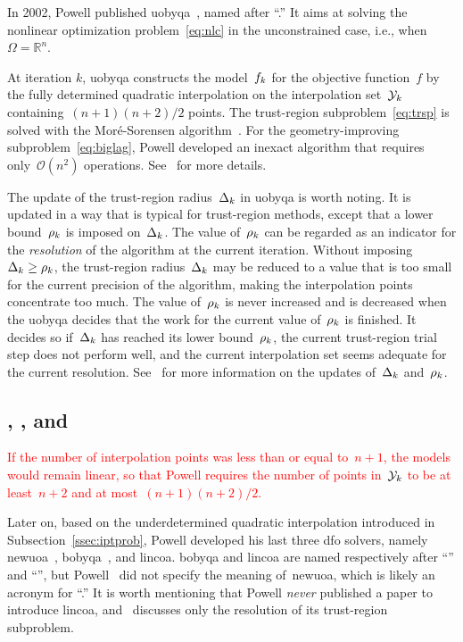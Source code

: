 \documentclass[
    smallextended,  %
    final,        %
]{svjour3}
\newcommand{\R}{\mathbb{R}}
\newcommand{\fset}{\Omega}
\newcommand{\objm}[1][k]{\obj\ifthenelse{\equal{#1}{}}{}{_{#1}}}
\newcommand{\obj}{f}
\newcommand{\rad}[1][k]{\Delta\ifthenelse{\equal{#1}{}}{}{_{#1}}}
\newcommand{\radlb}[1][k]{\rho\ifthenelse{\equal{#1}{}}{}{_{#1}}}
\newcommand{\xpt}[1][k]{\mathcal{Y}\ifthenelse{\equal{#1}{}}{}{_{#1}}}
\newcommand{\red}{\textcolor{red}}
\begin{document}
In 2002, Powell published \gls{uobyqa}~\cite{Powell_2002}, named after ``.''
It aims at solving the nonlinear optimization problem~\eqref{eq:nlc} in the unconstrained case, i.e., when~$\fset = \R^n$.


At iteration $k$, \gls{uobyqa} constructs the model~$\objm$ for the objective function~$\obj$
by the fully determined quadratic interpolation on the interpolation set~$\xpt$ containing~$(n + 1)(n + 2) / 2$ points.
The trust-region subproblem~\eqref{eq:trsp} is solved with the Mor{\'{e}}-Sorensen algorithm~\cite{More_Sorensen_1983}.
For the geometry-improving subproblem~\eqref{eq:biglag}, Powell developed an inexact algorithm that requires only~$\mathcal{O}(n^2)$
operations. See~\cite[\S~2]{Powell_2002} for more details.

The update of the trust-region radius~$\rad$ in \gls{uobyqa} is worth noting.
It is updated in a way that is typical for trust-region methods, except that a  lower
bound~$\radlb$ is imposed on~$\rad$.
The value of~$\radlb[k]$ can be regarded as an indicator for the \emph{resolution} of the algorithm at the current iteration.
Without imposing~$\rad[k] \ge \radlb[k]$, the trust-region radius~$\rad[k]$ may be reduced to a
value that is too small for the current precision of the algorithm, making the interpolation points
concentrate too much.
The value of~$\radlb[k]$ is never increased and is decreased when the \gls{uobyqa} decides that the work for the current value of~$\radlb[k]$ is finished.
It decides so if~$\rad[k]$ has reached its lower bound~$\radlb[k]$,
the current trust-region trial step does not perform well,
and the current interpolation set seems adequate for the current resolution.
See~\cite[\S~3]{Powell_2002} for more information on the updates of~$\rad$ and~$\radlb[k]$.


\subsection{, , and }
\label{ssec:nbloa}

\red{
If the number of interpolation points was less than or equal to~$n + 1$, the models would remain
linear, so that Powell requires the number of points in~$\xpt$ to be at least~$n + 2$ and at
most~$(n + 1)(n + 2) / 2$.
}

Later on, based on the underdetermined quadratic interpolation introduced in Subsection~\ref{ssec:iptprob},
Powell developed his last three \gls{dfo} solvers, namely \gls{newuoa}~\cite{Powell_2006,Powell_2008}, \gls{bobyqa}~\cite{Powell_2009}, and \gls{lincoa}.
\Gls{bobyqa} and \gls{lincoa} are named respectively after ``'' and
``'', but Powell~\cite{Powell_2006,Powell_2008} did not specify the meaning
of~\gls{newuoa}, which is likely an acronym for ``.''
It is worth mentioning that Powell \emph{never} published a paper to introduce \gls{lincoa}, and~\cite{Powell_2015} discusses only the resolution of its trust-region subproblem.
\end{document}
